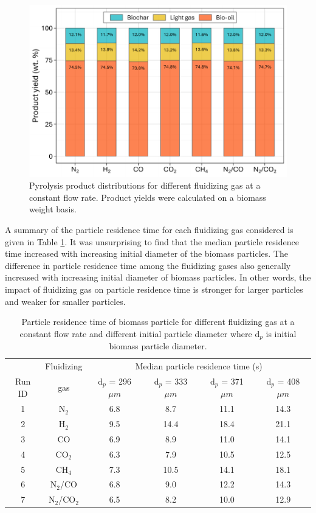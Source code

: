 \documentclass{article}
\begin{document}
\begin{figure}[H]
    \centering
    \includegraphics[width=1.0\textwidth]{figures/cfd-product-yield.pdf}
    \caption{Pyrolysis product distributions for different fluidizing gas at a constant flow rate. Product yields were calculated on a biomass weight basis.}
    \label{fig:cfd-product-yield}
\end{figure}

A summary of the particle residence time for each fluidizing gas considered is given in Table \ref{tab:particle-restime}. It was unsurprising to find that the median particle residence time increased with increasing initial diameter of the biomass particles. The difference in particle residence time among the fluidizing gases also generally increased with increasing initial diameter of biomass particles. In other words, the impact of fluidizing gas on particle residence time is stronger for larger particles and weaker for smaller particles.

\begin{table}[H]
    \centering
    \caption{Particle residence time of biomass particle for different fluidizing gas at a constant flow rate and different initial particle diameter where d$_p$ is initial biomass particle diameter.}
    \label{tab:particle-restime}
    \begin{tabular}{cccccc}
        \toprule
               & Fluidizing & \multicolumn{4}{c}{Median particle residence time (s)} \\
        Run ID & gas        & d$_p$ = 296 $\mu m$ & d$_p$ = 333 $\mu m$ & d$_p$ = 371 $\mu m$ & d$_p$ = 408 $\mu m$ \\
        \midrule
        1 & N$_2$        & 6.8 & 8.7  & 11.1  & 14.3 \\
        2 & H$_2$        & 9.5 & 14.4 & 18.4 & 21.1 \\
        3 & CO           & 6.9 & 8.9  & 11.0  & 14.1 \\
        4 & CO$_2$       & 6.3 & 7.9  & 10.5  & 12.5 \\
        5 & CH$_4$       & 7.3 & 10.5  & 14.1 & 18.1 \\
        6 & N$_2$/CO     & 6.8 & 9.0  & 12.2  & 14.3 \\
        7 & N$_2$/CO$_2$ & 6.5 & 8.2  & 10.0  & 12.9 \\
        \bottomrule
    \end{tabular}
\end{table}
\end{document}

